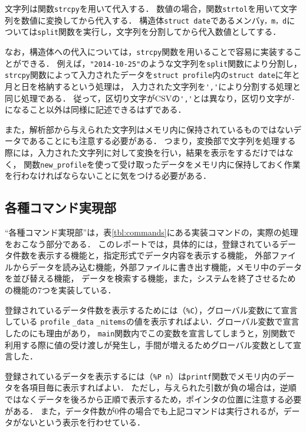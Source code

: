 \documentclass[a4j,11pt]{jarticle}
\begin{document}
文字列は関数\verb|strcpy|を用いて代入する．
数値の場合，関数\verb|strtol|を用いて文字列を数値に変換してから代入する．
構造体\verb|struct date|であるメンバ\verb|y，m，d|については\verb|split|関数を実行し，文字列を分割してから代入数値としてする．

なお，構造体への代入については，\verb|strcpy|関数を用いることで容易に実装することができる．
例えば，\verb|"2014-10-25"|のような文字列を\verb|split|関数により分割し，
\verb|strcpy|関数によって入力されたデータを\verb|struct profile|内の\verb|struct date|に年と月と日を格納するという処理は，
入力された文字列を\verb|','|により分割する処理と同じ処理である．
従って，区切り文字がCSVの\verb|','|とは異なり，区切り文字が\verb|-|になること以外は同様に記述できるはずである．

また，解析部から与えられた文字列はメモリ内に保持されているものではないデータであることにも注意する必要がある．
つまり，変換部で文字列を処理する際には，入力された文字列に対して変換を行い，結果を表示をするだけではなく，
関数\verb|new_profile|を使って受け取ったデータをメモリ内に保持しておく作業を行わなければならないことに気をつける必要がある．

\subsection{各種コマンド実現部} \label{sec:command}

``各種コマンド実現部''は，表\ref{tbl:commands}にある実装コマンドの，実際の処理をおこなう部分である．
このレポートでは，具体的には，登録されているデータ件数を表示する機能と，指定形式でデータ内容を表示する機能，
外部ファイルからデータを読み込む機能，外部ファイルに書き出す機能，メモリ中のデータを並び替える機能，
データを検索する機能，また，システムを終了させるための機能の7つを実装している．

登録されているデータ件数を表示するためには（\verb|%C|），グローバル変数にて宣言している
\verb|profile| \verb|_data| \verb|_nitems|の値を表示すればよい．グローバル変数で宣言したのにも理由があり，
\verb|main|関数内でこの変数を宣言してしまうと，別関数で利用する際に値の受け渡しが発生し，手間が増えるためグローバル変数として宣言した．

登録されているデータを表示するには（\verb|%P n|）は\verb|printf|関数でメモリ内のデータを各項目毎に表示すればよい．
ただし，与えられた引数が負の場合は，逆順ではなくデータを後ろから正順で表示するため，ポインタの位置に注意する必要がある．
また，データ件数が0件の場合でも上記コマンドは実行されるが，データがないという表示を行わせている．
\end{document}
